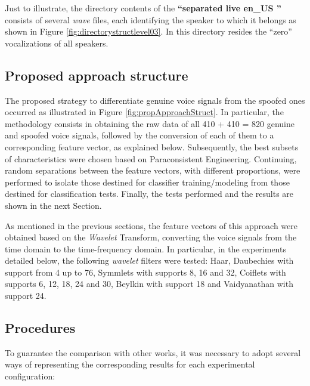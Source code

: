 		\par Just to illustrate, the directory contents of the \textbf{``separated \textfractionsolidus live \textfractionsolidus en\_US ''} consists of several \textit{wave} files, each identifying the speaker to which it belongs as shown in Figure \ref{fig:directorystructlevel03}. In this directory resides the “zero” vocalizations of all speakers.
	
	\subsection{Proposed approach structure}
		\par The proposed strategy to differentiate genuine voice signals from the spoofed ones occurred as illustrated in Figure \ref{fig:propApproachStruct}. In particular, the methodology consists in obtaining the raw data of all 410 + 410 = 820 genuine and spoofed voice signals, followed by the conversion of each of them to a corresponding feature vector, as explained below. Subsequently, the best subsets of characteristics were chosen based on Paraconsistent Engineering. Continuing, random separations between the feature vectors, with different proportions, were performed to isolate those destined for classifier training/modeling from those destined for classification tests. Finally, the tests performed and the results are shown in the next Section.
		
		
		
		\par As mentioned in the previous sections, the feature vectors of this approach were obtained based on the \textit{Wavelet} Transform, converting the voice signals from the time domain to the time-frequency domain. In particular, in the experiments detailed below, the following \textit{wavelet} filters were tested: Haar, Daubechies with support from 4 up to 76, Symmlets with supports 8, 16 and 32, Coiflets with supports 6, 12, 18, 24 and 30, Beylkin with support 18 and Vaidyanathan with support 24.

	\subsection{Procedures}
	
		\par To guarantee the comparison with other works, it was necessary to adopt several ways of representing the corresponding results for each experimental configuration:
	
